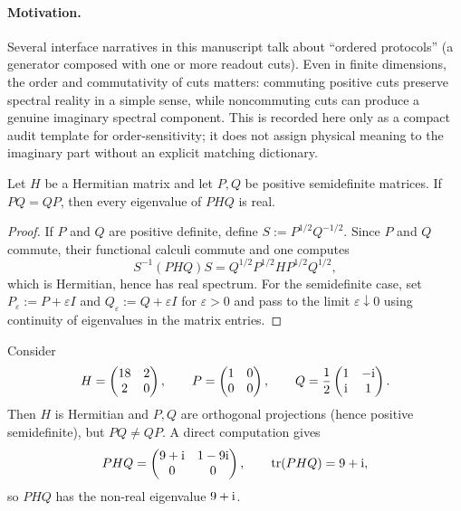 \paragraph{Motivation.}
\AuditTag Several interface narratives in this manuscript talk about ``ordered protocols'' (a generator composed with one or more readout cuts).
Even in finite dimensions, the order and commutativity of cuts matters: commuting positive cuts preserve spectral reality in a simple sense, while noncommuting cuts can produce a genuine imaginary spectral component.
This is recorded here only as a compact audit template for order-sensitivity; it does not assign physical meaning to the imaginary part without an explicit matching dictionary.

\begin{proposition}\label{prop:cuts_commuting_real_spectrum}
\MathTag Let $H$ be a Hermitian matrix and let $P,Q$ be positive semidefinite matrices.
If $PQ=QP$, then every eigenvalue of $PHQ$ is real.
\end{proposition}

\begin{proof}
If $P$ and $Q$ are positive definite, define $S:=P^{1/2}Q^{-1/2}$.
Since $P$ and $Q$ commute, their functional calculi commute and one computes
\[
S^{-1}(PHQ)S=Q^{1/2}P^{1/2}HP^{1/2}Q^{1/2},
\]
which is Hermitian, hence has real spectrum.
For the semidefinite case, set $P_\varepsilon:=P+\varepsilon I$ and $Q_\varepsilon:=Q+\varepsilon I$ for $\varepsilon>0$ and pass to the limit $\varepsilon\downarrow 0$ using continuity of eigenvalues in the matrix entries.
\end{proof}

\begin{remark}\label{rem:cuts_noncommuting_imaginary_component}
Consider
\[
H=\begin{pmatrix}18&2\\2&0\end{pmatrix},\qquad
P=\begin{pmatrix}1&0\\0&0\end{pmatrix},\qquad
Q=\frac12\begin{pmatrix}1&-\mathrm{i}\\\mathrm{i}&1\end{pmatrix}.
\]
Then $H$ is Hermitian and $P,Q$ are orthogonal projections (hence positive semidefinite), but $PQ\ne QP$.
A direct computation gives
\[
PHQ=\begin{pmatrix}9+\mathrm{i}&1-9\mathrm{i}\\0&0\end{pmatrix},
\qquad
\operatorname{tr}(PHQ)=9+\mathrm{i},
\]
so $PHQ$ has the non-real eigenvalue $9+\mathrm{i}$.
\end{remark}

